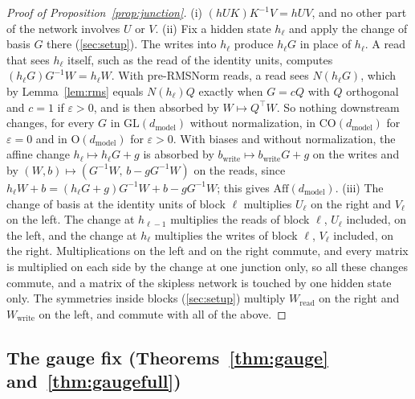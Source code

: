 \documentclass[10pt]{article}
\theoremstyle{definition}
\theoremstyle{remark}
\newcommand{\Wread}{W_{\mathrm{read}}}
\newcommand{\Wwrite}{W_{\mathrm{write}}}
\newcommand{\dm}{d_{\mathrm{model}}}
\newcommand{\GL}{\mathrm{GL}}
\newcommand{\Ort}{\mathrm{O}}
\newcommand{\CO}{\mathrm{CO}}
\newcommand{\Aff}{\mathrm{Aff}}
\begin{document}
\begin{proof}[Proof of Proposition~\ref{prop:junction}]
(i) $(hUK)K^{-1}V = hUV$, and no other part of the network involves $U$ or $V$.
(ii) Fix a hidden state $h_{\ell}$ and apply the change of basis $G$ there (\cref{sec:setup}). The writes into $h_{\ell}$ produce $h_\ell G$ in place of $h_\ell$. A read that sees $h_\ell$ itself, such as the read of the identity units, computes $(h_\ell G)G^{-1}W = h_\ell W$. With pre-RMSNorm reads, a read sees $N(h_\ell G)$, which by Lemma~\ref{lem:rms} equals $N(h_\ell)Q$ exactly when $G = cQ$ with $Q$ orthogonal and $c = 1$ if $\varepsilon > 0$, and is then absorbed by $W \mapsto Q^\top W$. So nothing downstream changes, for every $G$ in $\GL(\dm)$ without normalization, in $\CO(\dm)$ for $\varepsilon = 0$ and in $\Ort(\dm)$ for $\varepsilon > 0$. With biases and without normalization, the affine change $h_\ell \mapsto h_\ell G + g$ is absorbed by $b_{\mathrm{write}} \mapsto b_{\mathrm{write}}G + g$ on the writes and by $(W, b) \mapsto (G^{-1}W,\, b - gG^{-1}W)$ on the reads, since $h_\ell W + b = (h_\ell G + g)G^{-1}W + b - gG^{-1}W$; this gives $\Aff(\dm)$.
(iii) The change of basis at the identity units of block $\ell$ multiplies $U_\ell$ on the right and $V_\ell$ on the left. The change at $h_{\ell-1}$ multiplies the reads of block $\ell$, $U_\ell$ included, on the left, and the change at $h_\ell$ multiplies the writes of block $\ell$, $V_\ell$ included, on the right. Multiplications on the left and on the right commute, and every matrix is multiplied on each side by the change at one junction only, so all these changes commute, and a matrix of the skipless network is touched by one hidden state only. The symmetries inside blocks (\cref{sec:setup}) multiply $\Wread$ on the right and $\Wwrite$ on the left, and commute with all of the above.
\end{proof}

\subsection{The gauge fix\texorpdfstring{ (Theorems~\ref*{thm:gauge} and~\ref*{thm:gaugefull})}{}}\label{app:prf-gauge}
\end{document}
